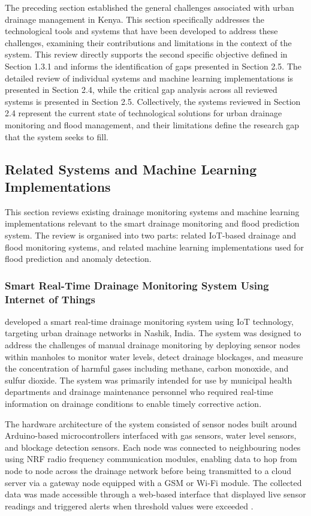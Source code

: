 \documentclass[12pt, a4paper]{article}
\begin{document}
The preceding section established the general challenges
associated with urban drainage management in Kenya. This
section specifically addresses the technological tools and
systems that have been developed to address these challenges,
examining their contributions and limitations in the context
of the system. This review directly supports the
second specific objective defined in Section 1.3.1 and
informs the identification of gaps presented in Section 2.5. The detailed review of individual systems and machine learning implementations is presented in Section 2.4, while the
critical gap analysis across all reviewed systems is presented in Section 2.5. Collectively, the systems reviewed in Section 2.4 represent the current state of technological solutions
for urban drainage monitoring and flood management, and their
limitations define the research gap that the system
seeks to fill.

\subsection{Related Systems and Machine Learning Implementations}

This section reviews existing drainage monitoring systems and machine learning implementations relevant to the smart drainage monitoring and flood prediction system. The review is organised into two parts: related IoT-based drainage and flood monitoring systems, and related machine learning implementations used for flood prediction and anomaly detection.

\subsubsection{Smart Real-Time Drainage Monitoring System Using Internet of Things}

\citet{sonawane2018} developed a smart real-time drainage monitoring system using IoT technology, targeting urban drainage networks in Nashik, India. The system was designed to address the challenges of manual drainage monitoring by deploying sensor nodes within manholes to monitor water levels, detect drainage blockages, and measure the concentration of harmful gases including methane, carbon monoxide, and sulfur dioxide. The system was primarily intended for use by municipal health departments and drainage maintenance personnel who required real-time information on drainage conditions to enable timely corrective action.

The hardware architecture of the system consisted of sensor nodes built around Arduino-based microcontrollers interfaced with gas sensors, water level sensors, and blockage detection sensors. Each node was connected to neighbouring nodes using NRF radio frequency communication modules, enabling data to hop from node to node across the drainage network before being transmitted to a cloud server via a gateway node equipped with a GSM or Wi-Fi module. The collected data was made accessible through a web-based interface that displayed live sensor readings and triggered alerts when threshold values were exceeded \citep{sonawane2018}.
\end{document}
